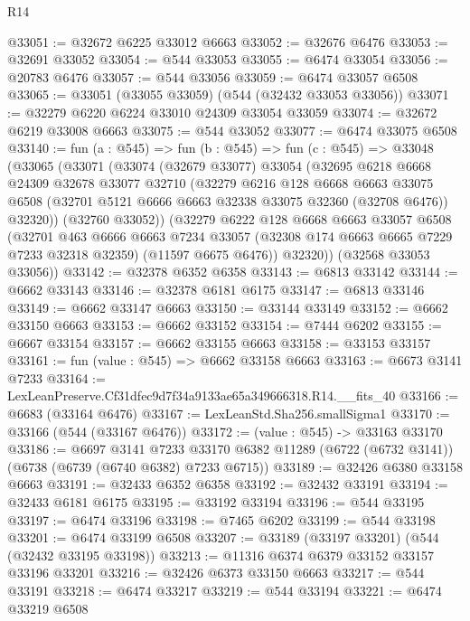 \begin{lexlean}{R14}
\begin{coremodule}
@33051 := @32672 @6225 @33012 @6663
@33052 := @32676 @6476
@33053 := @32691 @33052
@33054 := @544 @33053
@33055 := @6474 @33054
@33056 := @20783 @6476
@33057 := @544 @33056
@33059 := @6474 @33057 @6508
@33065 := @33051 (@33055 @33059) (@544 (@32432 @33053 @33056))
@33071 := @32279 @6220 @6224 @33010 @24309 @33054 @33059
@33074 := @32672 @6219 @33008 @6663
@33075 := @544 @33052
@33077 := @6474 @33075 @6508
@33140 := fun (a : @545) =>
  fun (b : @545) =>
  fun (c : @545) =>
  @33048
    (@33065
      (@33071
        (@33074
          (@32679 @33077)
          @33054
          (@32695
            @6218
            @6668
            @24309
            @32678
            @33077
            @32710
            (@32279
              @6216
              @128
              @6668
              @6663
              @33075
              @6508
              (@32701 @5121 @6666 @6663 @32338 @33075 @32360 (@32708 @6476))
              @32320))
          (@32760 @33052))
        (@32279
          @6222
          @128
          @6668
          @6663
          @33057
          @6508
          (@32701
            @463
            @6666
            @6663
            @7234
            @33057
            (@32308 @174 @6663 @6665 @7229 @7233 @32318 @32359)
            (@11597 @6675 @6476))
          @32320))
      (@32568 @33053 @33056))
@33142 := @32378 @6352 @6358
@33143 := @6813 @33142
@33144 := @6662 @33143
@33146 := @32378 @6181 @6175
@33147 := @6813 @33146
@33149 := @6662 @33147 @6663
@33150 := @33144 @33149
@33152 := @6662 @33150 @6663
@33153 := @6662 @33152
@33154 := @7444 @6202
@33155 := @6667 @33154
@33157 := @6662 @33155 @6663
@33158 := @33153 @33157
@33161 := fun (value : @545) => @6662 @33158 @6663
@33163 := @6673 @3141 @7233
@33164 := LexLeanPreserve.Cf31dfec9d7f34a9133ae65a349666318.R14.__fits_40
@33166 := @6683 (@33164 @6476)
@33167 := LexLeanStd.Sha256.smallSigma1
@33170 := @33166 (@544 (@33167 @6476))
@33172 := (value : @545) -> @33163 @33170
@33186 := @6697
    @3141
    @7233
    @33170
    @6382
    @11289
    (@6722 (@6732 @3141))
    (@6738 (@6739 (@6740 @6382) @7233 @6715))
@33189 := @32426 @6380 @33158 @6663
@33191 := @32433 @6352 @6358
@33192 := @32432 @33191
@33194 := @32433 @6181 @6175
@33195 := @33192 @33194
@33196 := @544 @33195
@33197 := @6474 @33196
@33198 := @7465 @6202
@33199 := @544 @33198
@33201 := @6474 @33199 @6508
@33207 := @33189 (@33197 @33201) (@544 (@32432 @33195 @33198))
@33213 := @11316 @6374 @6379 @33152 @33157 @33196 @33201
@33216 := @32426 @6373 @33150 @6663
@33217 := @544 @33191
@33218 := @6474 @33217
@33219 := @544 @33194
@33221 := @6474 @33219 @6508

\end{coremodule}
\end{lexlean}
